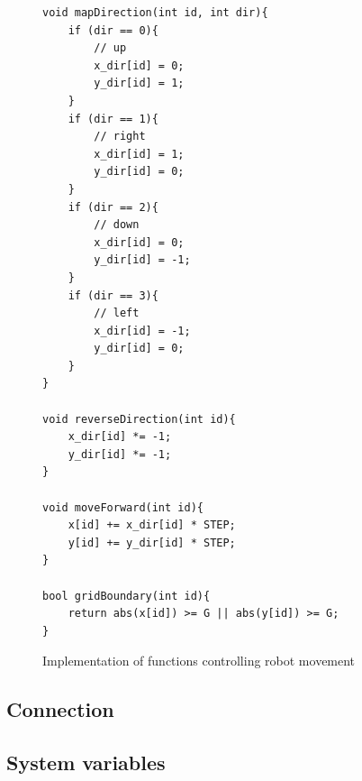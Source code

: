 \begin{figure}
\caption{Implementation of functions controlling robot movement}
\begin{lstlisting}[style=code]
void mapDirection(int id, int dir){
    if (dir == 0){
		// up
        x_dir[id] = 0;
        y_dir[id] = 1;
    }
    if (dir == 1){
		// right
        x_dir[id] = 1;
        y_dir[id] = 0;
    }
    if (dir == 2){
		// down
        x_dir[id] = 0;
        y_dir[id] = -1;
    }
    if (dir == 3){
		// left
        x_dir[id] = -1;
        y_dir[id] = 0;
    }
}

void reverseDirection(int id){
	x_dir[id] *= -1;
	y_dir[id] *= -1;
}

void moveForward(int id){
	x[id] += x_dir[id] * STEP;
	y[id] += y_dir[id] * STEP;
}

bool gridBoundary(int id){
    return abs(x[id]) >= G || abs(y[id]) >= G;
}
\end{lstlisting}
\label{fig:movement_implementation}
\end{figure}



\subsection{Connection}



\subsection{System variables}
